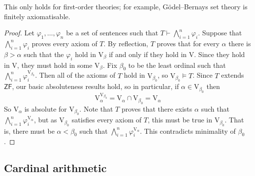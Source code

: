 This only holds for first-order theories; for example, G\"odel--Bernays set theory is finitely axiomatisable.
\begin{proof}
    Let \( \varphi_1, \dots, \varphi_n \) be a set of sentences such that \( T \vdash \bigwedge_{i=1}^n \varphi_i \).
    Suppose that \( \bigwedge_{i=1}^n \varphi_i \) proves every axiom of \( T \).
    By reflection, \( T \) proves that for every \( \alpha \) there is \( \beta > \alpha \) such that the \( \varphi_i \) hold in \( \mathrm{V}_\beta \) if and only if they hold in \( \mathrm{V} \).
    Since they hold in \( \mathrm{V} \), they must hold in some \( \mathrm{V}_\beta \).
    Fix \( \beta_0 \) to be the least ordinal such that \( \bigwedge_{i=1}^n \varphi_i^{\mathrm{V}_{\beta_0}} \).
    Then all of the axioms of \( T \) hold in \( \mathrm{V}_{\beta_0} \), so \( \mathrm{V}_{\beta_0} \vDash T \).
    Since \( T \) extends \( \mathsf{ZF} \), our basic absoluteness results hold, so in particular, if \( \alpha \in \mathrm{V}_{\beta_0} \) then
    \[ \mathrm{V}_\alpha^{\mathrm{V}_{\beta_0}} = \mathrm{V}_\alpha \cap \mathrm{V}_{\beta_0} = \mathrm{V}_\alpha \]
    So \( \mathrm{V}_\alpha \) is absolute for \( \mathrm{V}_{\beta_0} \).
    Note that \( T \) proves that there exists \( \alpha \) such that \( \bigwedge_{i=1}^n \varphi_i^{\mathrm{V}_\alpha} \), but as \( \mathrm{V}_{\beta_0} \) satisfies every axiom of \( T \), this must be true in \( \mathrm{V}_{\beta_0} \).
    That is, there must be \( \alpha < \beta_0 \) such that \( \bigwedge_{i=1}^n \varphi_i^{\mathrm{V}_\alpha} \).
    This contradicts minimality of \( \beta_0 \).
\end{proof}

\subsection{Cardinal arithmetic}
